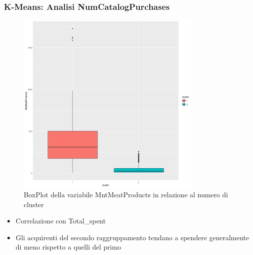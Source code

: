 \begin{frame}[fragile]
\frametitle{K-Means: Analisi NumCatalogPurchases}
\begin{minipage}{0.45\textwidth}
\begin{figure}[H]
        \centering
    \includegraphics[width=0.8\textwidth]{Img/KMEANS021.png}
    \caption{BoxPlot della variabile MntMeatProducts in relazione al numero di cluster}
    \label{fig:MntMeatProductsKmeansBoxPlot}
\end{figure}
\end{minipage}%
\hspace{2em}
\begin{minipage}{0.45\textwidth}
\begin{itemize}
    \item Correlazione con Total\_spent
    \item Gli acquirenti del secondo raggruppamento tendano a spendere generalmente di meno rispetto a quelli del primo
\end{itemize}
\end{minipage}%
\end{frame}


